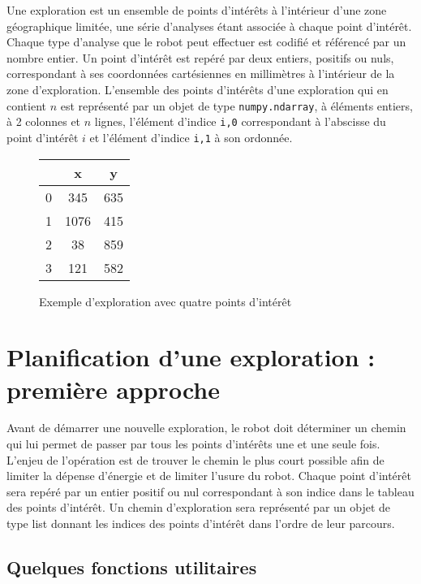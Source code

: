 Une exploration est un ensemble de points d’intérêts à l’intérieur d’une zone géographique limitée, une série
d’analyses étant associée à chaque point d’intérêt. Chaque type d’analyse que le robot peut effectuer est codifié
et référencé par un nombre entier. Un point d’intérêt est repéré par deux entiers, positifs ou nuls, correspondant
à ses coordonnées cartésiennes en millimètres à l’intérieur de la zone d’exploration. L’ensemble des points
d’intérêts d’une exploration qui en contient $n$ est représenté par un objet de type \texttt{numpy.ndarray}, à éléments
entiers, à 2 colonnes et $n$ lignes, l’élément d’indice \texttt{i,0} correspondant à l’abscisse du point d’intérêt $i$ et l’élément
d’indice \texttt{i,1} à son ordonnée.

\begin{figure}[H]
\centering
\begin{tabular} {c||cc} 

 	& x 		& y     \\ \hline 
0 	& 345 	& 635 \\ %
1 	& 1076 	& 415 \\ %
2 	& 38 		& 859 \\ %
3 	& 121 	& 582 \\ %
\end{tabular}
\caption{Exemple d’exploration avec quatre points d’intérêt \label{fig_02}}
\end{figure}


\section{Planification d’une exploration : première approche}

Avant de démarrer une nouvelle exploration, le robot doit déterminer un chemin qui lui permet de passer par
tous les points d’intérêts une et une seule fois. L’enjeu de l’opération est de trouver le chemin le plus court
possible afin de limiter la dépense d’énergie et de limiter l’usure du robot.
Chaque point d’intérêt sera repéré par un entier positif ou nul correspondant à son indice dans le tableau des
points d’intérêt. Un chemin d’exploration sera représenté par un objet de type list donnant les indices des
points d’intérêt dans l’ordre de leur parcours.


\subsection{Quelques fonctions utilitaires}

